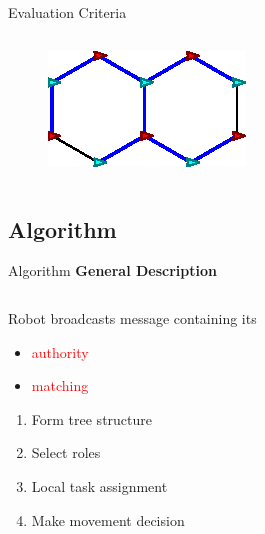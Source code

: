 \documentclass[10pt]{beamer}
\begin{document}
\begin{frame}{Evaluation Criteria}
\begin{columns}[T]
\begin{column}{.5\textwidth}
\begin{figure}
      \end{figure}
      \begin{figure}
        \centering
        \includegraphics[scale=0.65]{figs/good-hexagon}
      \end{figure}
    \end{column}%
  \end{columns}
\end{frame}
\subsection[Algorithm]{Algorithm}
\begin{frame}{Algorithm}
  \textbf{General Description}
  \begin{columns}[T] %
   \begin{column}{.45\textwidth}
     Robot broadcasts message containing its
     \begin{itemize}
     \item \textcolor{red}{authority} 
     \item \textcolor{red}{matching}
     \end{itemize}

     \begin{enumerate}
     \item Form tree structure
     \item Select roles
     \item Local task assignment
     \item Make movement decision
     \end{enumerate}
    \end{column}%
    \begin{column}{.45\textwidth}
      
    \end{column}%
  \end{columns}
\end{frame}
\end{document}
